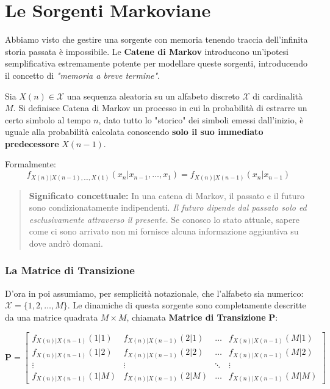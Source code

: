 
\chapter{Le Sorgenti Markoviane}

Abbiamo visto che gestire una sorgente con memoria tenendo traccia dell'infinita storia passata è impossibile. Le \textbf{Catene di Markov} introducono un'ipotesi semplificativa estremamente potente per modellare queste sorgenti, introducendo il concetto di \textit{"memoria a breve termine"}.

Sia $X(n) \in \mathcal{X}$ una sequenza aleatoria su un alfabeto discreto $\mathcal{X}$ di cardinalità $M$. 
Si definisce Catena di Markov un processo in cui la probabilità di estrarre un certo simbolo al tempo $n$, dato tutto lo "storico" dei simboli emessi dall'inizio, è uguale alla probabilità calcolata conoscendo \textbf{solo il suo immediato predecessore} $X(n-1)$.

Formalmente:
\begin{equation}
    f_{X(n)|X(n-1),\dots,X(1)}(x_n|x_{n-1},\dots,x_1) = f_{X(n)|X(n-1)}(x_n|x_{n-1})
\end{equation}

\begin{quote}
    \textbf{Significato concettuale:} In una catena di Markov, il passato e il futuro sono condizionatamente indipendenti. \textit{Il futuro dipende dal passato solo ed esclusivamente attraverso il presente.} Se conosco lo stato attuale, sapere come ci sono arrivato non mi fornisce alcuna informazione aggiuntiva su dove andrò domani.
\end{quote}

\subsection{La Matrice di Transizione}

D'ora in poi assumiamo, per semplicità notazionale, che l'alfabeto sia numerico: $\mathcal{X} = \{1, 2, \dots, M\}$.
Le dinamiche di questa sorgente sono completamente descritte da una matrice quadrata $M \times M$, chiamata \textbf{Matrice di Transizione} $\mathbf{P}$:

\begin{equation}
\mathbf{P} = \begin{bmatrix}
    f_{X(n)|X(n-1)}(1|1) & f_{X(n)|X(n-1)}(2|1) & \dots & f_{X(n)|X(n-1)}(M|1) \\
    f_{X(n)|X(n-1)}(1|2) & f_{X(n)|X(n-1)}(2|2) & \dots & f_{X(n)|X(n-1)}(M|2) \\
    \vdots & \vdots & \ddots & \vdots \\
    f_{X(n)|X(n-1)}(1|M) & f_{X(n)|X(n-1)}(2|M) & \dots & f_{X(n)|X(n-1)}(M|M)
\end{bmatrix}
\end{equation}


